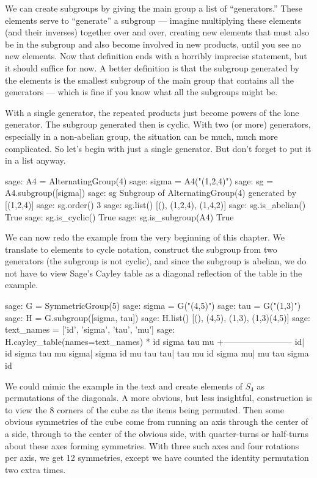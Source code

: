 %
We can create subgroups by giving the main group a list of ``generators.''  These elements serve to ``generate'' a subgroup --- imagine multiplying these elements (and their inverses) together over and over, creating new elements that must also be in the subgroup and also become involved in new products, until you see no new elements.  Now that definition ends with a horribly imprecise statement, but it should suffice for now.  A better definition is that the subgroup generated by the elements is the smallest subgroup of the main group that contains all the generators --- which is fine if you know what all the subgroups might be.\par
%
With a single generator, the repeated products just become powers of the lone generator.  The subgroup generated then is cyclic.  With two (or more) generators, especially in a non-abelian group, the situation can be much, much more complicated.  So let's begin with just a single generator.  But don't forget to put it in a list anyway.
%
\begin{sageexample}
sage: A4 = AlternatingGroup(4)
sage: sigma = A4("(1,2,4)")
sage: sg = A4.subgroup([sigma])
sage: sg
Subgroup of AlternatingGroup(4) generated by [(1,2,4)]
sage: sg.order()
3
sage: sg.list()
[(), (1,2,4), (1,4,2)]
sage: sg.is_abelian()
True
sage: sg.is_cyclic()
True
sage: sg.is_subgroup(A4)
True
\end{sageexample}
%
We can now redo the example from the very beginning of this chapter.  We translate to elements to cycle notation, construct the subgroup from two generators (the subgroup is not cyclic), and since the subgroup is abelian, we do not have to view Sage's Cayley table as a diagonal reflection of the table in the example.
%
\begin{sageexample}
sage: G = SymmetricGroup(5)
sage: sigma = G("(4,5)")
sage: tau = G("(1,3)")
sage: H = G.subgroup([sigma, tau])
sage: H.list()
[(), (4,5), (1,3), (1,3)(4,5)]
sage: text_names = ['id', 'sigma', 'tau', 'mu']
sage: H.cayley_table(names=text_names)
    *     id sigma   tau    mu
     +------------------------
   id|    id sigma   tau    mu
sigma| sigma    id    mu   tau
  tau|   tau    mu    id sigma
   mu|    mu   tau sigma    id
\end{sageexample}
%
%
We could mimic the example in the text and create elements of $S_4$ as permutations of the diagonals.  A more obvious, but less insightful, construction is to view the 8 corners of the cube as the items being permuted.  Then some obvious symmetries of the cube come from running an axis through the center of a side, through to the center of the obvious side, with quarter-turns or half-turns about these axes forming symmetries.  With three such axes and four rotations per axis, we get 12 symmetries, except we have counted the identity permutation two extra times.\par
